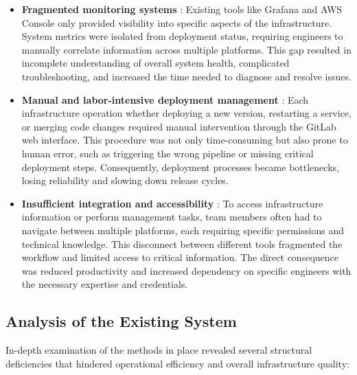 \begin{itemize}
    \item \textbf{Fragmented monitoring systems} : Existing tools like Grafana and AWS Console only provided visibility into specific aspects of the infrastructure. System metrics were isolated from deployment status, requiring engineers to manually correlate information across multiple platforms. This gap resulted in incomplete understanding of overall system health, complicated troubleshooting, and increased the time needed to diagnose and resolve issues.
    
    \item \textbf{Manual and labor-intensive deployment management} : Each infrastructure operation whether deploying a new version, restarting a service, or merging code changes required manual intervention through the GitLab web interface. This procedure was not only time-consuming but also prone to human error, such as triggering the wrong pipeline or missing critical deployment steps. Consequently, deployment processes became bottlenecks, losing reliability and slowing down release cycles.
    
    \item \textbf{Insufficient integration and accessibility} : To access infrastructure information or perform management tasks, team members often had to navigate between multiple platforms, each requiring specific permissions and technical knowledge. This disconnect between different tools fragmented the workflow and limited access to critical information. The direct consequence was reduced productivity and increased dependency on specific engineers with the necessary expertise and credentials.
\end{itemize}

\vspace{1cm}

\subsection{Analysis of the Existing System}
In-depth examination of the methods in place revealed several structural deficiencies that hindered operational efficiency and overall infrastructure quality:

